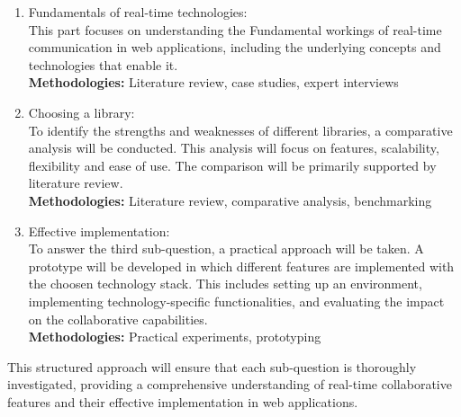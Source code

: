 \begin{enumerate}
    \item Fundamentals of real-time technologies: \\ This part focuses on understanding the Fundamental workings of real-time communication in web applications, including the underlying concepts and technologies that enable it. \\ \textbf{Methodologies:} Literature review, case studies, expert interviews
    \item Choosing a library: \\ To identify the strengths and weaknesses of different libraries, a comparative analysis will be conducted. This analysis will focus on features, scalability, flexibility and ease of use. The comparison will be primarily supported by literature review. \\ \textbf{Methodologies:} Literature review, comparative analysis, benchmarking
    \item Effective implementation: \\ To answer the third sub-question, a practical approach will be taken. A prototype will be developed in which different features are implemented with the choosen technology stack. This includes setting up an environment, implementing technology-specific functionalities, and evaluating the impact on the collaborative capabilities. \\ \textbf{Methodologies:} Practical experiments, prototyping
\end{enumerate}

This structured approach will ensure that each sub-question is thoroughly investigated, providing a comprehensive understanding of real-time collaborative features and their effective implementation in web applications.
